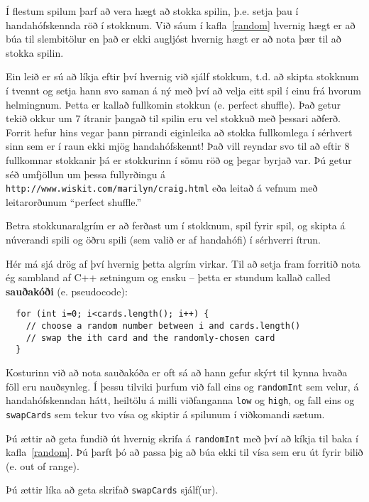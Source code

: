 Í flestum spilum þarf að vera hægt að stokka spilin, þ.e. setja þau í handahófskennda röð í stokknum.
Við sáum í kafla~\ref{random} hvernig hægt er að búa til slembitölur en það er ekki augljóst hvernig hægt er 
að nota þær til að stokka spilin.

Ein leið er sú að líkja eftir því hvernig við sjálf stokkum, t.d. að skipta stokknum í tvennt
og setja hann svo saman á ný með því að velja eitt spil í einu frá hvorum helmingnum.
Þetta er kallað fullkomin stokkun (e. perfect shuffle).
Það getur tekið okkur um 7 ítranir þangað til spilin eru vel stokkuð með þessari aðferð.
Forrit hefur hins vegar þann pirrandi eiginleika að stokka fullkomlega í sérhvert sinn sem er í raun ekki mjög handahófskennt!
Það vill reyndar svo til að eftir 8 fullkomnar stokkanir þá er stokkurinn í sömu röð og þegar byrjað var.
Þú getur séð umfjöllun um þessa fullyrðingu á {\tt http://www.wiskit.com/marilyn/craig.html} eða leitað á vefnum
með leitarorðunum ``perfect shuffle.''

Betra stokkunaralgrím er að ferðast um í stokknum, spil fyrir spil, og skipta á núverandi spili og öðru spili (sem valið er af handahófi) í sérhverri ítrun. 


Hér má sjá drög af því hvernig þetta algrím virkar.
Til að setja fram forritið nota ég sambland af C++ setningum og ensku -- þetta er stundum kallað 
called {\bf sauðakóði} (e. pseudocode):

\begin{verbatim}
  for (int i=0; i<cards.length(); i++) {
    // choose a random number between i and cards.length()
    // swap the ith card and the randomly-chosen card
  }
\end{verbatim}
%
Kosturinn við að nota sauðakóða er oft sá að hann gefur skýrt til kynna hvaða föll eru nauðsynleg.
Í þessu tilviki þurfum við fall eins og {\tt randomInt} sem velur, á handahófskenndan hátt, heiltölu á milli
viðfanganna {\tt low} og {\tt high}, og fall eins og {\tt swapCards} sem tekur tvo vísa og skiptir á spilunum í viðkomandi sætum.


Þú ættir að geta fundið út hvernig skrifa á {\tt randomInt} með því að kíkja til baka í kafla~\ref{random}.
Þú þarft þó að passa þig að búa ekki til vísa sem eru út fyrir bilið (e. out of range). 


Þú ættir líka að geta skrifað {\tt swapCards} sjálf(ur). 

